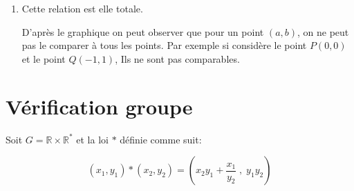 \documentclass[12pt,a4paper,dvipsnames]{article}
\begin{document}
\begin{enumerate}
\item Cette relation est elle totale.

    D'après le graphique on peut observer que pour un point $(a,b)$, on ne peut
    pas le comparer à tous les points. Par exemple si considère le point
    $P(0,0)$ et le point $Q(-1,1)$, Ils ne sont pas comparables.
    
\end{enumerate}
\section{Vérification groupe}%
\label{sec:vérification_groupe}
Soit $G=\mathbb{R}\times \mathbb{R}^{*}$ et la loi $*$ définie comme suit:

\begin{equation}
    (x_1,y_1) * (x_2, y_2) = (x_2y_1 + \frac{x_1}{y_2}\;,\; y_1y_2)
\end{equation}
\end{document}
